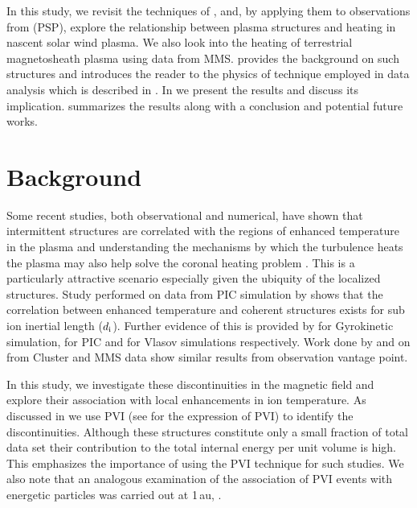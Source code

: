         In this study, we revisit the techniques of \citet{Osman2011, Osman2012a}, and, by applying
        them to observations from
         (PSP), explore the relationship between plasma structures and heating in nascent
        solar wind plasma. We also look into the heating of terrestrial magnetosheath plasma using
        data from MMS.  provides the background on such structures and introduces
        the reader to the physics of technique employed in data analysis which is described in
        . In  we present the results and discuss its implication.
         summarizes the results along with a conclusion and potential future works.

    \section{Background} \label{sec:bgnd6}

        Some recent studies, both observational and numerical, have shown that intermittent
        structures are correlated with the regions of enhanced temperature in the plasma
        \citep{Osman2012, Osman2011, Greco2012} and understanding the mechanisms by which the
        turbulence heats the plasma may also help solve the coronal heating problem
        \citep{Osman2012a}. This is a particularly attractive scenario especially given the ubiquity
        of the localized structures. Study performed on data from PIC simulation by \citet{Wu2013}
        shows that the correlation between enhanced temperature and coherent structures exists for
        sub ion inertial length ($d_{\rm i}$). Further evidence of this is provided by
        \citet{TenBarge2013} for Gyrokinetic simulation, \citet{Parashar2009, Wan2012,
        Karimabadi2013, Wan2015} for PIC and \citet{Servidio2012, Servidio2015} for Vlasov
        simulations respectively. Work done by \citet{Chasapis2015} and \citet{Yordanova2016} on
        from Cluster and MMS data show similar results from observation vantage point.

        In this study, we investigate these discontinuities in the magnetic field and explore their
        association with local enhancements in ion temperature. As discussed in  we
        use PVI (see  for the expression of PVI) to identify the discontinuities.
        Although these structures constitute only a small fraction of total data set their
        contribution to the total internal energy per unit volume is high. This emphasizes the
        importance of using the PVI technique for such studies. We also note that an analogous
        examination of the association of PVI events with energetic particles was carried out at
        1\,au, \citep{Tessein2016}.


